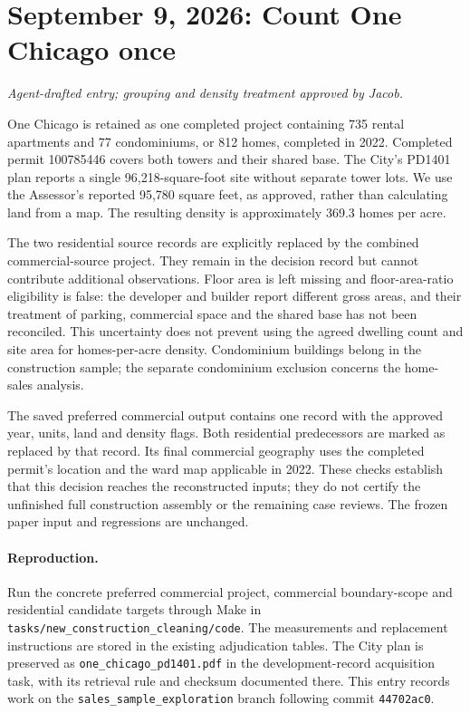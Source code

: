 \clearpage
\section*{September 9, 2026: Count One Chicago once}
\textit{Agent-drafted entry; grouping and density treatment approved by Jacob.}

One Chicago is retained as one completed project containing 735 rental apartments and 77 condominiums, or 812 homes, completed in 2022. Completed permit 100785446 covers both towers and their shared base. The City's PD1401 plan reports a single 96,218-square-foot site without separate tower lots. We use the Assessor's reported 95,780 square feet, as approved, rather than calculating land from a map. The resulting density is approximately 369.3 homes per acre.

The two residential source records are explicitly replaced by the combined commercial-source project. They remain in the decision record but cannot contribute additional observations. Floor area is left missing and floor-area-ratio eligibility is false: the developer and builder report different gross areas, and their treatment of parking, commercial space and the shared base has not been reconciled. This uncertainty does not prevent using the agreed dwelling count and site area for homes-per-acre density. Condominium buildings belong in the construction sample; the separate condominium exclusion concerns the home-sales analysis.

The saved preferred commercial output contains one record with the approved year, units, land and density flags. Both residential predecessors are marked as replaced by that record. Its final commercial geography uses the completed permit's location and the ward map applicable in 2022. These checks establish that this decision reaches the reconstructed inputs; they do not certify the unfinished full construction assembly or the remaining case reviews. The frozen paper input and regressions are unchanged.

\paragraph{Reproduction.} Run the concrete preferred commercial project, commercial boundary-scope and residential candidate targets through Make in \texttt{tasks/new\_construction\_cleaning/code}. The measurements and replacement instructions are stored in the existing adjudication tables. The City plan is preserved as \texttt{one\_chicago\_pd1401.pdf} in the development-record acquisition task, with its retrieval rule and checksum documented there. This entry records work on the \texttt{sales\_sample\_exploration} branch following commit \texttt{44702ac0}.
